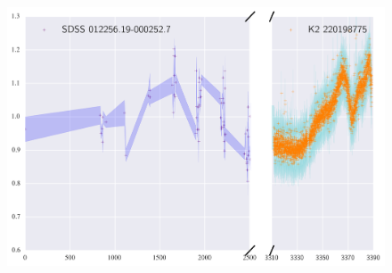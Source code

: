 \documentclass[a4paper,fleqn,usenatbib]{mnras}
\begin{document}
        
        \begin{figure}
        		\includegraphics[width=\columnwidth]{220198775ExtendedLC.png}
        		\caption{}
        		\label{fig:example_figure}
        	\end{figure}   
        	
\end{document}
